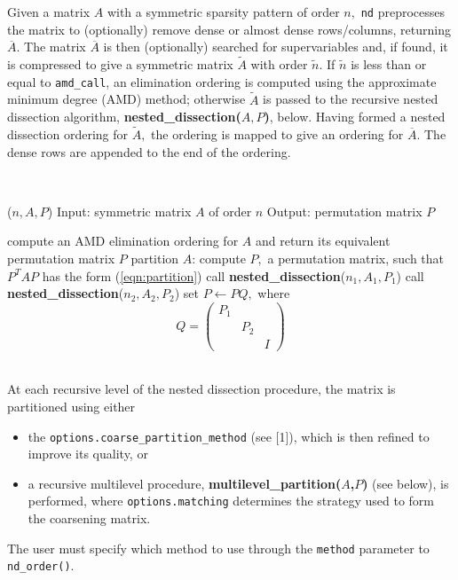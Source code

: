Given a matrix $A$ with a symmetric sparsity pattern of order $n,$ {\tt nd} preprocesses 
the matrix to (optionally) remove dense or almost dense rows/columns, returning 
$\overline{A}.$ The matrix $\overline{A}$ is then (optionally) searched for 
supervariables and, if found, it is compressed to give a symmetric matrix 
$\widetilde{A}$ with order $\tilde{n}.$ If $\tilde{n}$ is less than or equal to 
{\tt amd\_call}, an elimination ordering is computed using the 
approximate minimum degree (AMD) method; otherwise $\widetilde{A}$ is passed to the 
recursive nested dissection algorithm, \textbf{nested\_dissection($A,P$)}, below. Having formed a 
nested dissection ordering for $\widetilde{A},$ the 
ordering is mapped to give an ordering for $\overline{A}.$ The dense rows are 
appended to the end of the ordering. 

\noindent\hrulefill\\
\vspace{-1.0em}
\begin{algorithmic}
($n,A,P$)
\STATE Input: symmetric matrix $A$ of order $n$
\STATE Output: permutation matrix $P$

\STATE compute an AMD elimination ordering for $A$ and return its equivalent 
permutation matrix $P$ 
\ELSE
\STATE partition $A$: compute $P,$ a permutation matrix, such that $P^T A P$ 
has the form (\ref{eqn:partition})
\STATE call {\bf nested\_dissection}($n_1,A_1,P_1$)
\STATE call {\bf nested\_dissection}($n_2,A_2,P_2$)
\STATE set $P \leftarrow PQ,$ where $$Q = \left( \begin{array}{ccc} P_1 & & \\ & P_2 & \\ & & I  \end{array} \right)$$
\ENDIF

\end{algorithmic}
\noindent\hrulefill\\

At each recursive level of the nested dissection procedure, the matrix is 
partitioned using either 
\begin{itemize}
\item the {\tt options.coarse\_partition\_method} (see [1]), which is then refined to improve its 
quality, or 
\item a recursive multilevel procedure,  \textbf{multilevel\_partition($A$,$P$)} (see below), 
is performed, where \texttt{options.matching} determines the strategy used to form 
the coarsening matrix.
\end{itemize}
The user must specify which method to use through the \texttt{method} parameter
to \texttt{nd\_order()}.

